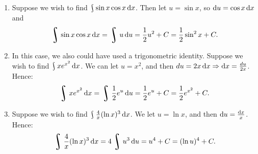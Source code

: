 \begin{exs}\leavevmode
  \begin{enumerate}
    \item Suppose we wish to find $ \rint \sin x \cos x \dif{x} $. Then let $ u = \sin x $, so $ \dif{u} = \cos x \dif{x} $
          and
          \begin{displaymath}
            \rint \sin x \cos x \dif{x} = \rint u \dif{u} = \frac{1}{2} u^2 + C = \frac{1}{2} \sin^2 x + C.
          \end{displaymath}
    \item In this case, we also could have used a trigonometric identity.
          Suppose we wish to find $ \rint xe^{x^2} \dif{x} $. We can let $ u = x^2 $, and then $ du = 2x \dif{x} \Rightarrow \dif{x} = \frac{du}{2x} $.
          Hence:
          \begin{displaymath}
            \rint xe^{x^2} \dif{x} = \rint \frac{1}{2} e^u \dif{u} = \frac{1}{2} e^u + C = \frac{1}{2}e^{x^2} + C.
          \end{displaymath}
    \item Suppose we wish to find $ \rint \frac{4}{x} (\ln x)^3 \dif{x} $. We let $ u = \ln x $, and then $ \dif{u} = \frac{\dif{x}}{x} $.
          Hence:
          \begin{displaymath}
            \rint \frac{4}{x} (\ln x)^3 \dif{x} = 4\rint u^3 \dif{u} = u^4 + C = (\ln u)^4 + C.
          \end{displaymath}
  \end{enumerate}
\end{exs}

